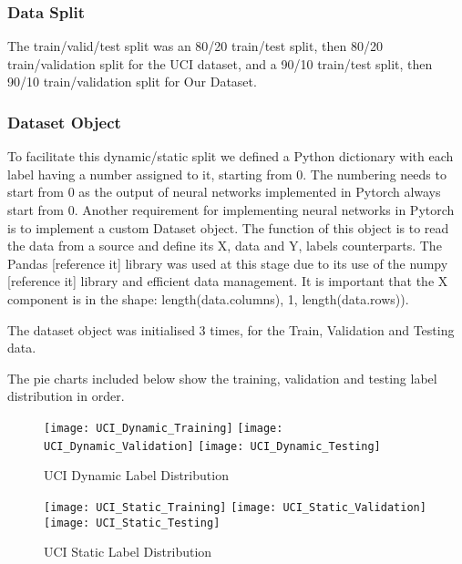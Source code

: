     \subsubsection{Data Split}
        The train/valid/test split was an 80/20 train/test split, then 80/20 train/validation split for the UCI dataset, and a 90/10 train/test split, then 90/10 train/validation split for Our Dataset.
    \subsubsection{Dataset Object}
        To facilitate this dynamic/static split we defined a Python dictionary with each label having a number assigned to it, starting from 0.
        The numbering needs to start from 0 as the output of neural networks implemented in Pytorch always start from 0.
        Another requirement for implementing neural networks in Pytorch is to implement a custom Dataset object.
        The function of this object is to read the data from a source and define its X, data and Y, labels counterparts.
        The Pandas [reference it] library was used at this stage due to its use of the numpy [reference it] library and efficient data management.
        It is important that the X component is in the shape: length(data.columns), 1, length(data.rows)).

        The dataset object was initialised 3 times, for the Train, Validation and Testing data.

        The pie charts included below show the training, validation and testing label distribution in order.

        \begin{figure}[h]
        \centering
        \texttt{[image: UCI\_Dynamic\_Training]}\hfill
        \texttt{[image: UCI\_Dynamic\_Validation]}\hfill
        \texttt{[image: UCI\_Dynamic\_Testing]}
        \caption{UCI Dynamic Label Distribution}
        \label{fig:figureX}
        \end{figure}

        \begin{figure}[h]
        \centering
        \texttt{[image: UCI\_Static\_Training]}\hfill
        \texttt{[image: UCI\_Static\_Validation]}\hfill
        \texttt{[image: UCI\_Static\_Testing]}
        \caption{UCI Static Label Distribution}
        \label{fig:figureX}
        \end{figure}


